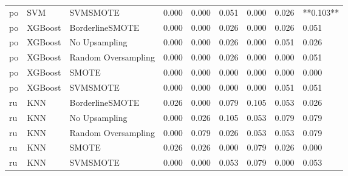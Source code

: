 \begin{tabular}{lllllllll}
      po &                          SVM &            SVMSMOTE & 0.000 &                     0.000 &                 0.051 &                  0.000 &                                   0.026 & **0.103** \\
      po &                      XGBoost &     BorderlineSMOTE & 0.000 &                     0.000 &                 0.026 &                  0.000 &                                   0.026 &     0.051 \\
      po &                      XGBoost &       No Upsampling & 0.000 &                     0.000 &                 0.026 &                  0.000 &                                   0.051 &     0.026 \\
      po &                      XGBoost & Random Oversampling & 0.000 &                     0.000 &                 0.026 &                  0.000 &                                   0.000 &     0.051 \\
      po &                      XGBoost &               SMOTE & 0.000 &                     0.000 &                 0.000 &                  0.000 &                                   0.000 &     0.000 \\
      po &                      XGBoost &            SVMSMOTE & 0.000 &                     0.000 &                 0.000 &                  0.000 &                                   0.051 &     0.051 \\
      ru &                          KNN &     BorderlineSMOTE & 0.026 &                     0.000 &                 0.079 &                  0.105 &                                   0.053 &     0.026 \\
      ru &                          KNN &       No Upsampling & 0.000 &                     0.026 &                 0.105 &                  0.053 &                                   0.079 &     0.079 \\
      ru &                          KNN & Random Oversampling & 0.000 &                     0.079 &                 0.026 &                  0.053 &                                   0.053 &     0.079 \\
      ru &                          KNN &               SMOTE & 0.026 &                     0.026 &                 0.000 &                  0.079 &                                   0.026 &     0.000 \\
      ru &                          KNN &            SVMSMOTE & 0.000 &                     0.000 &                 0.053 &                  0.079 &                                   0.000 &     0.053 \\

\end{tabular}
